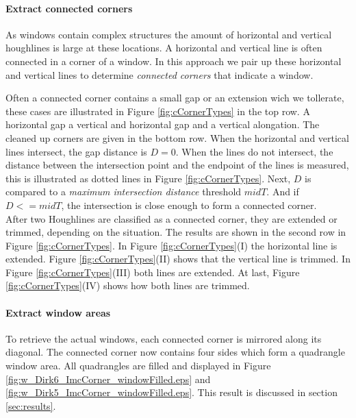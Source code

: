 \paragraph{Extract connected corners}
 As windows contain complex structures
the amount of horizontal and vertical houghlines is large at these locations.
A horizontal and vertical line is often connected in a corner of a window.  In
this approach we pair up these horizontal and vertical lines to determine
\emph{connected corners} that indicate a window.

Often a connected corner contains a small gap or an extension wich we tollerate,
these cases are illustrated in Figure \ref{fig:cCornerTypes} in the top row.
A horizontal gap a vertical and horizontal gap and a vertical alongation. The
cleaned up corners are given in the bottom row.  When the horizontal and
vertical lines intersect, the gap distance is $D=0$.  When the lines do not
intersect, the distance between the intersection point and the endpoint of the
lines is measured, this is illustrated as dotted lines in Figure
\ref{fig:cCornerTypes}.  Next, $D$ is compared to a \emph{maximum intersection
distance} threshold $midT$.  And if $D<=midT$, the intersection is close enough
to form a connected corner.\\

After two Houghlines are classified as a connected corner, they are extended or
trimmed, depending on the situation. The results are shown in the second row in
Figure \ref{fig:cCornerTypes}.
In Figure \ref{fig:cCornerTypes}(I)  the horizontal line is extended.  Figure
\ref{fig:cCornerTypes}(II) shows that the vertical line is trimmed.  In Figure
\ref{fig:cCornerTypes}(III) both lines are extended.  At last, Figure
\ref{fig:cCornerTypes}(IV) shows how both lines are trimmed.


\paragraph{Extract window areas}
To retrieve the actual windows, each connected corner is mirrored along its
diagonal. The connected corner now contains four sides which form a 
quadrangle window area.
All quadrangles are filled and displayed in Figure
\ref{fig:w_Dirk6_ImcCorner_windowFilled.eps} and
\ref{fig:w_Dirk5_ImcCorner_windowFilled.eps}. This result is discussed in section
\ref{sec:results}.


